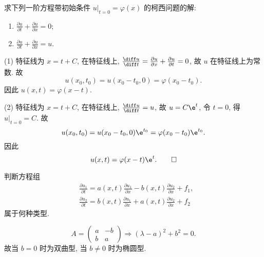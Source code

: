 \begin{exercise}
  求下列一阶方程带初始条件 $u|_{t=0} = \varphi(x)$ 的柯西问题的解:
  \begin{enumerate}[(1)]
    \item $\frac{\partial u}{\partial t} + \frac{\partial u}{\partial x} = 0$;
    \item $\frac{\partial u}{\partial t} + \frac{\partial u}{\partial x} = u$.
  \end{enumerate}
\end{exercise}

\begin{solve}
  (1) 特征线为 $x = t+C$, 在特征线上, $\frac{\diff u}{\diff t} = 
    \frac{\partial u}{\partial x} + \frac{\partial u}{\partial t} = 0$,
  故 $u$ 在特征线上为常数. 故
  \[u(x_0, t_0) = u(x_0-t_0, 0) = \varphi(x_0-t_0).\]
  因此 $u(x,t) = \varphi(x-t)$.

  (2) 特征线为 $x = t+C$, 在特征线上, $\frac{\diff u}{\diff t} = u$,
  故 $u = C\e^t$, 令 $t=0$, 得 $u|_{t=0} = C$. 故
  \[u(x_0, t_0) = u(x_0-t_0, 0) \e^{t_0} = \varphi(x_0-t_0)\e^{t_0}.\]
  因此
  \[u(x, t) = \varphi(x-t) \e^t. \qedhere\]
\end{solve}


\begin{exercise}
  判断方程组
  \begin{align*}
    & \frac{\partial u_1}{\partial t} = a(x,t) \frac{\partial u_1}{\partial x}
      - b(x,t) \frac{\partial u_2}{\partial x} + f_1, \\
    & \frac{\partial u_2}{\partial t} = b(x,t) \frac{\partial u_1}{\partial x}
      + a(x,t) \frac{\partial u_2}{\partial x} + f_2
  \end{align*}
  属于何种类型.
\end{exercise}

\begin{solve}
  \[A = \begin{pmatrix}
    a & -b \\
    b & a
  \end{pmatrix} \Rightarrow (\lambda-a)^2+b^2 = 0.\]
  故当 $b=0$ 时为双曲型, 当 $b\neq 0$ 时为椭圆型.
\end{solve}


